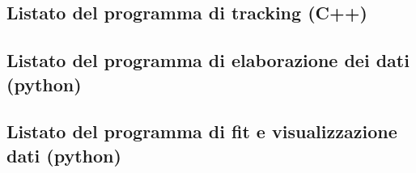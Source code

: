 \documentclass[11pt, a4paper, twoside]{article}
\begin{document}
\subsection{Listato del programma di tracking (C++)}

\label{listatocpp}
\subsection{Listato del programma di elaborazione dei dati (python)}

\label{listatoavg}
\subsection{Listato del programma di fit e visualizzazione dati (python)}

\label{listatoplotter}
\end{document}
